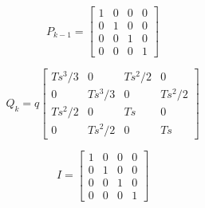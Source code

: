 \documentclass[12pt]{article}
\begin{document}
\[
P_{k-1}=
  \begin{bmatrix}
1 & 0 & 0 & 0\\
0 & 1  & 0 & 0\\
0 & 0 & 1 &0\\
0 & 0 & 0 &1
  \end{bmatrix}
\]


\[
Q_{k} = q 		
  \begin{bmatrix}
Ts^{3}/3 & 0 & Ts^{2}/2 & 0\\
0 & Ts^{3}/3  & 0 & Ts^{2}/2\\
Ts^{2}/2 & 0 & Ts &0\\
0 & Ts^{2}/2 & 0 &Ts
  \end{bmatrix}
\]




\[
I =
  \begin{bmatrix}
1 & 0 & 0 & 0\\
0 & 1  & 0 & 0\\
0 & 0 & 1 &0\\
0 & 0 & 0 &1
  \end{bmatrix}
\]

\end{document}

